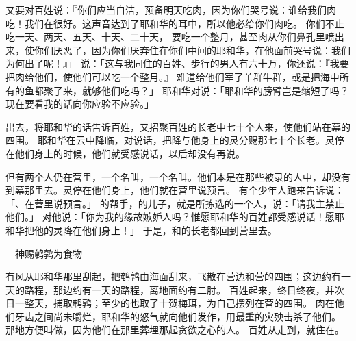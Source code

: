 {又要对百姓说：『你们应当自洁，预备明天吃肉，因为你们哭号说：谁给我们肉吃！我们在{}很好。这声音达到了耶和华的耳中，所以他必给你们肉吃。
你们不止吃一天、两天、五天、十天、二十天，
要吃一个整月，甚至肉从你们鼻孔里喷出来，使你们厌恶了，因为你们厌弃住在你们中间的耶和华，在他面前哭号说：我们为何出了{}呢！』」
说：「这与我同住的百姓、步行的男人有六十万，你还说：『我要把肉给他们，使他们可以吃一个整月。』
难道给他们宰了羊群牛群，或是把海中所有的鱼都聚了来，就够他们吃吗？」
耶和华对{}说：「耶和华的膀臂岂是缩短了吗？现在要看我的话向你应验不应验。」
\par }{\PP {}出去，将耶和华的话告诉百姓，又招聚百姓的长老中七十个人来，使他们站在{}幕的四围。
耶和华在云中降临，对{}说话，把降与他身上的灵分赐那七十个长老。灵停在他们身上的时候，他们就受感说话，以后却没有再说。
\par }{\PP {}但有两个人仍在营里，一个名叫{}，一个名叫{}。他们本是在那些被录的人中，却没有到{}幕那里去。灵停在他们身上，他们就在营里说预言。
有个少年人跑来告诉{}说：「{}、{}在营里说预言。」
的帮手，{}的儿子{}，就是{}所拣选的一个人，说：「请我主{}禁止他们。」
对他说：「你为我的缘故嫉妒人吗？惟愿耶和华的百姓都受感说话！愿耶和华把他的灵降在他们身上！」
于是，{}和{}的长老都回到营里去。
\par }{\SH 　神赐鹌鹑为食物
\par }{\PP {}有风从耶和华那里刮起，把鹌鹑由海面刮来，飞散在营边和营的四围；这边约有一天的路程，那边约有一天的路程，离地面约有二肘。
百姓起来，终日终夜，并次日一整天，捕取鹌鹑；至少的也取了十贺梅珥，为自己摆列在营的四围。
肉在他们牙齿之间尚未嚼烂，耶和华的怒气就向他们发作，用最重的灾殃击杀了他们。
那地方便叫做{}，因为他们在那里葬埋那起贪欲之心的人。
百姓从{}走到{}，就住在{}。

}
